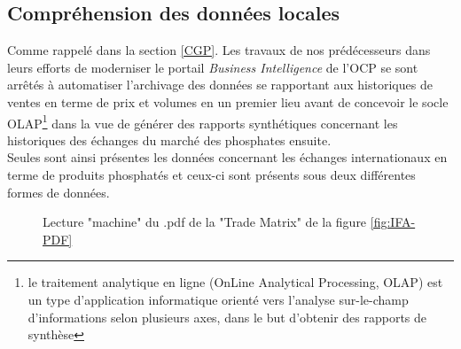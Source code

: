	\subsection{Compréhension des données locales}
	Comme rappelé dans la section \ref{CGP}. Les travaux de nos prédécesseurs dans leurs efforts de moderniser le portail \textit{Business Intelligence} de l'OCP se sont arrêtés à automatiser l'archivage des données se rapportant aux historiques de ventes en terme de prix et volumes en un premier lieu\cite{CHEMLAL} avant de concevoir le socle OLAP\footnote{le traitement analytique en ligne (OnLine Analytical Processing, OLAP) est un type d'application informatique orienté vers l'analyse sur-le-champ d'informations selon plusieurs axes, dans le but d'obtenir des rapports de synthèse} dans la vue de générer des rapports synthétiques concernant les historiques des échanges du marché des phosphates ensuite\cite{NACER}.\\
	Seules sont ainsi présentes les données concernant les échanges internationaux en terme de produits phosphatés et ceux-ci sont présents sous deux différentes formes de données.
					\begin{figure}
						\raggedleft
						\raggedleft
						\caption{Lecture "machine" du .pdf de la "Trade Matrix" de la figure \ref{fig:IFA-PDF}}
						\label{fig:IFA-TXT}
					\end{figure}
